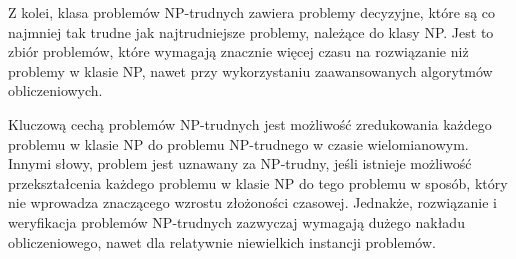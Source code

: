 Z kolei, klasa problemów NP-trudnych zawiera problemy decyzyjne, które są co najmniej tak trudne jak najtrudniejsze problemy, należące do klasy NP. Jest to zbiór problemów, które wymagają znacznie więcej czasu na rozwiązanie niż problemy w klasie NP, nawet przy wykorzystaniu zaawansowanych algorytmów obliczeniowych. 

Kluczową cechą problemów NP-trudnych jest możliwość zredukowania każdego problemu w klasie NP do problemu NP-trudnego w czasie wielomianowym. Innymi słowy, problem jest uznawany za NP-trudny, jeśli istnieje możliwość przekształcenia każdego problemu w klasie NP do tego problemu w sposób, który nie wprowadza znaczącego wzrostu złożoności czasowej. Jednakże, rozwiązanie i weryfikacja problemów NP-trudnych zazwyczaj wymagają dużego nakładu obliczeniowego, nawet dla relatywnie niewielkich instancji problemów.